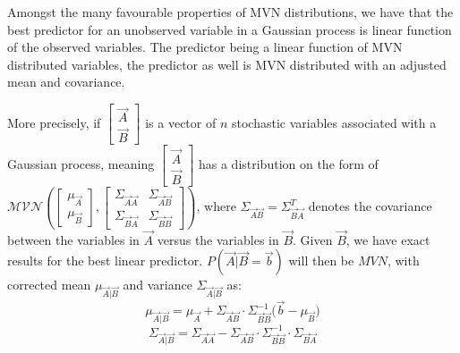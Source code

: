 Amongst the many favourable properties of MVN distributions, we have that the best predictor for an unobserved variable in a Gaussian process is linear function of the observed variables. The predictor being a linear function of MVN distributed variables, the predictor as well is MVN distributed with an adjusted mean and covariance.

More precisely, if $\begin{bmatrix} \vec{A} \\ \vec{B} \end{bmatrix}$ is a vector of $n$ stochastic variables associated with a Gaussian process, meaning $\begin{bmatrix} \vec{A} \\ \vec{B} \end{bmatrix}$ has a distribution on the form of $\mathcal{MVN}(\begin{bmatrix} \mu_{\vec{A}} \\ \mu_{\vec{B}} \end{bmatrix}, \begin{bmatrix} \Sigma_{\vec{A}\vec{A}} & \Sigma_{\vec{A}\vec{B}} \\ \Sigma_{\vec{B}\vec{A}} & \Sigma_{\vec{B}\vec{B}} \end{bmatrix})$, where $\Sigma_{\vec{A}\vec{B}} = \Sigma_{\vec{B}\vec{A}}^T$ denotes the covariance between the variables in $\vec{A}$ versus the variables in $\vec{B}$.  Given $\vec{B}$, we have exact results for the best linear predictor. $P(\vec{A} | \vec{B} = \vec{b})$ will then be $MVN$, with corrected mean $\mu_{\vec{A} | \vec{B}}$ and variance $\Sigma_{\vec{A} | \vec{B}}$ as:
\begin{equation}\label{eq:gaussian_conditional_expectancy} 
\mu_{\vec{A} | \vec{B}} = \mu_{\vec{A}} + \Sigma_{\vec{A}\vec{B}}\cdot \Sigma_{\vec{B}\vec{B}}^{-1}\big( \vec{b} - \mu_{\vec{B}} \big) 
\end{equation}
\begin{equation}\label{eq:gaussian_conditional_variance}
\Sigma_{\vec{A} | \vec{B}} = \Sigma_{\vec{A}\vec{A}} - \Sigma_{\vec{A}\vec{B}} \cdot \Sigma_{\vec{B}\vec{B}}^{-1} \cdot \Sigma_{\vec{B}\vec{A}} 
\end{equation}

